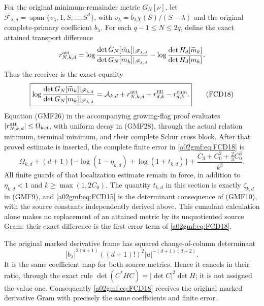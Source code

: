 For the original minimum-remainder metric \(G_N[\nu]\), let
\(\mathscr F_{\lambda,d}
 =\operatorname{span}\{v_\lambda,1,S,\ldots,S^d\}\), with
\(v_\lambda=b_\lambda\chi(S)/(S-\lambda)\) and the original
complete-primary coefficient \(b_\lambda\).
For each \(q-1\le N\le2q\), define the exact attained transport difference
\[
 r_{N,k,d}^{\rm att}
  =\log\frac{\det G_N[\widetilde m_k]|_{\mathscr F_{\lambda,d}}}
                  {\det G_N[m_k]|_{\mathscr F_{\lambda,d}}}
    -\log\frac{\det H_d[\widetilde m_k]}{\det H_d[m_k]} .
\]
Thus the receiver is the exact equality
\begin{equation}
 \boxed{\displaystyle
 \log\frac{\det G_N[\widetilde m_k]|_{\mathscr F_{\lambda,d}}}
                  {\det G_N[m_k]|_{\mathscr F_{\lambda,d}}}
  =\mathcal A_{k,d}+r_{N,k,d}^{\rm att}
                          +r_{d,k}^{\rm fill}-r_{d,k}^{\rm cum}.}
 \tag{FCD18}\label{a02gmf:eq:FCD18}
\end{equation}
Equation (GMF26) in the accompanying growing-flag proof evaluates
\(|r_{N,k,d}^{\rm att}|\le\Omega_{k,d}\), with uniform decay in (GMF28),
through the actual relation
minimum, terminal minimum, and their complete Schur cross block.
After that proved estimate is inserted, the complete finite error in
\eqref{a02gmf:eq:FCD18} is
\begin{equation}
 \Omega_{k,d}
 +(d+1)\{-\log(1-\eta_{k,d})+\log(1+t_{k,d})\}
 +\frac{C_3+C_0^2+\tfrac23C_0^3}{k^3}.
 \tag{FCD19}\label{a02gmf:eq:FCD19}
\end{equation}
All finite guards of that localization estimate remain in force, in
addition to \(\eta_{k,d}<1\) and \(k\ge\max(1,2C_0)\).
The quantity \(t_{k,d}\) in this section is exactly \(\zeta_{k,d}\)
in (GMF9), and \eqref{a02gmf:eq:FCD15} is the determinant consequence
of (GMF10), with the source constants independently derived above.
This cumulant calculation alone makes no replacement of an attained
metric by its unquotiented source Gram: their exact difference is
the first error term of \eqref{a02gmf:eq:FCD18}.

The original marked derivative frame has squared change-of-column
determinant
\[
 |b_\lambda|^{2(d+1)}((d+1)!)^2
                  |u|^{-(d+1)(d+2)} .
\]
It is the same coefficient map for both source metrics. Hence it cancels
in their ratio, through the exact rule
\(\det(C^*HC)=|\det C|^2\det H\); it is not assigned the value one.
Consequently \eqref{a02gmf:eq:FCD18} receives the original marked derivative
Gram with precisely the same coefficients and finite error.

